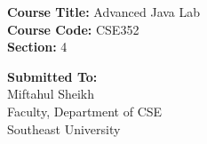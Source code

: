 \documentclass[12pt, a4paper]{article}
\begin{document}
\begin{titlepage}
\begin{center}
            \textbf{Course Title:} Advanced Java Lab \\                                                                                                                    
            \textbf{Course Code:} CSE352 \\                                                                                                                                
            \textbf{Section:} 4                                                                                                                                            
                                                                                                                                                                           
            \vspace{2cm}                                                                                                                                                   
                                                                                                                                                                           
            \begin{flushleft}                                                                                                                                              
                \textbf{Submitted To:}\\                                                                                                                                   
                Miftahul Sheikh \\                                                                                                                                         
                Faculty, Department of CSE\\                                                                                                                               
                Southeast University                                                                                                                                       
            \end{flushleft}                                                                                                                                                
                                                                                                                                                                           

\end{center}
\end{titlepage}
\end{document}
